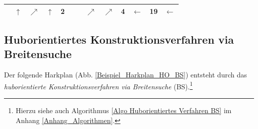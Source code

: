 \begin{center}
\begin{minipage}{\textwidth}
\begin{table}[H]
\begin{scriptsize}
\begin{tabular}{|>{}c|>{}c|>{}c|>{}c|>{}c|>{}c|>{}c|>{}c|>{}c|>{}c|>{}c|>{}c|>{}c|}
\hline
\cellcolor{gray!50!white}&\cellcolor{green!15!white}$\uparrow$&\cellcolor{blue!15!white}$\nearrow$&\cellcolor{blue!15!white}$\uparrow$&
\cellcolor{red!15!white}\bf{2}&\cellcolor{gray!50!white}&\cellcolor{gray!50!white}&$\nearrow$&$\nearrow$&\cellcolor{green!15!white}\bf{4}&\cellcolor{green!15!white}$\leftarrow$&\bf{19}&$\leftarrow$ \\
\hline
\end{tabular}
\label{Beispiel_Harkplan_HO_Maximal_}
\end{scriptsize} 
\end{table}
\renewcommand{\arraystretch}{1}
\end{minipage}
\end{center}


\newpage
\subsection{Huborientiertes Konstruktionsverfahren via Breitensuche}

Der folgende Harkplan (Abb. \ref{Beispiel_Harkplan_HO_BS}) entsteht durch das \textit{huborientierte Konstruktionsverfahren via Breitensuche} (BS).\footnote{Hierzu siehe auch Algorithmus \ref{Algo Huborientiertes Verfahren BS} im Anhang \ref{Anhang_Algorithmen}.}

